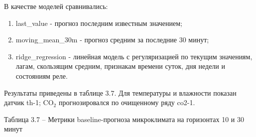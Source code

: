 \documentclass[a4paper,14pt]{extarticle}
\renewcommand{\texttt}[1]{\textnormal{#1}}
\providecommand{\tightlist}{%
  \setlength{\itemsep}{0pt}\setlength{\parskip}{0pt}}
\begin{document}
В качестве моделей сравнивались:

\begin{enumerate}
\def\labelenumi{\arabic{enumi})}
\tightlist
\item
  \texttt{last\_value} - прогноз последним известным значением;
\item
  \texttt{moving\_mean\_30m} - прогноз средним за последние 30 минут;
\item
  \texttt{ridge\_regression} - линейная модель с регуляризацией по
  текущим значениям, лагам, скользящим средним, признакам времени суток,
  дня недели и состояниям реле.
\end{enumerate}

Результаты приведены в таблице 3.7. Для температуры и влажности показан
датчик \texttt{th-1}; CO\(_2\) прогнозировался по очищенному ряду
\texttt{co2-1}.

Таблица 3.7 -- Метрики baseline-прогноза микроклимата на горизонтах 10 и
30 минут
\end{document}
